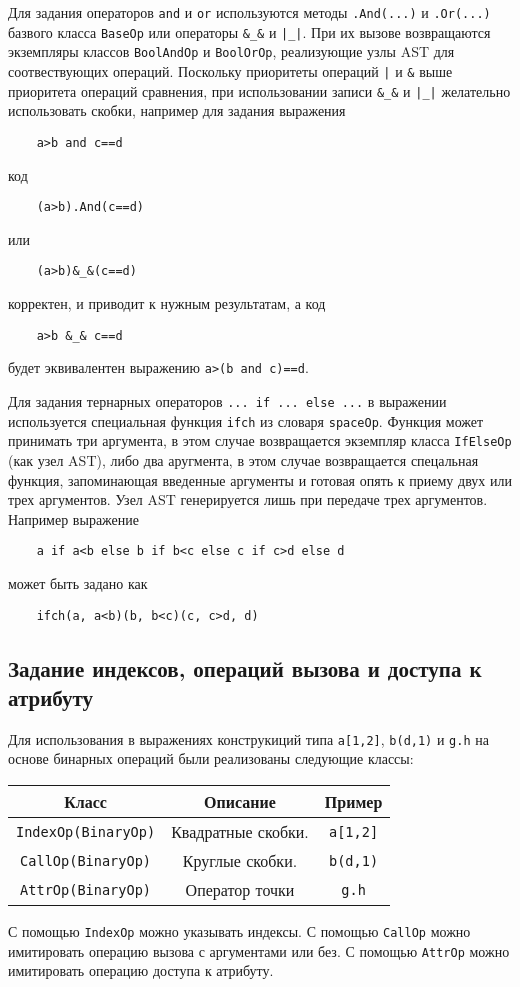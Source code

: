 Для задания операторов \verb'and' и \verb'or' используются методы \verb'.And(...)' и \verb'.Or(...)' базвого класса \verb'BaseOp' 
или операторы \verb'&_&' и \verb'|_|'. При их вызове возвращаются экземпляры классов \verb'BoolAndOp' и \verb'BoolOrOp', реализующие
узлы AST для соотвествующих операций. Поскольку приоритеты  операций \verb'|' и \verb'&' выше приоритета операций сравнения, при использовании 
записи  \verb'&_&' и \verb'|_|' желательно использовать скобки, например для задания выражения 
\begin{verbatim}
    a>b and c==d
\end{verbatim}
код
\begin{verbatim}
    (a>b).And(c==d)
\end{verbatim}
или
\begin{verbatim}
    (a>b)&_&(c==d)    
\end{verbatim}
корректен, и приводит к нужным результатам, а код 
\begin{verbatim}
    a>b &_& c==d   
\end{verbatim}
будет эквивалентен выражению \verb'a>(b and c)==d'.

Для задания тернарных операторов \verb'... if ... else ...' в выражении используется специальная функция \verb'ifch' из словаря \verb'spaceOp'. 
Функция может принимать три аргумента, в этом случае возвращается экземпляр класса \verb'IfElseOp' (как узел AST), либо два аругмента, в этом случае
возвращается спецальная функция, запоминающая введенные аргументы и готовая опять к приему двух или трех аргументов. Узел AST генерируется лишь при передаче 
трех аргументов. Например выражение
\begin{verbatim}
    a if a<b else b if b<c else c if c>d else d
\end{verbatim}
может быть задано как
\begin{verbatim}
    ifch(a, a<b)(b, b<c)(c, c>d, d)
\end{verbatim}

\subsection{Задание индексов, операций вызова и доступа к атрибуту} 
Для использования в выражениях конструкиций типа \verb"a[1,2]", \verb"b(d,1)" и \verb"g.h" на основе бинарных операций были реализованы следующие классы:
\begin{center}
\begin{tabular}{|c|c|c|}
\hline
Класс & Описание & Пример\\
\hline
 \verb"IndexOp(BinaryOp)" & Квадратные скобки.  & \verb"a[1,2]" \\
 
 \verb"CallOp(BinaryOp)" &  Круглые скобки.  &\verb"b(d,1)" \\
 
 \verb"AttrOp(BinaryOp)" &  Оператор точки & \verb"g.h"\\
\hline
\end{tabular}
\end{center}
С помощью \verb"IndexOp" можно указывать индексы. 
С помощью \verb"CallOp" можно имитировать операцию вызова с аргументами или без.
С помощью \verb"AttrOp" можно имитировать операцию доступа к атрибуту.